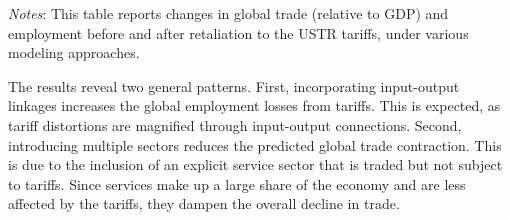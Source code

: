 \documentclass[12pt]{article}
\begin{document}
\begin{table}[htbp]
\caption{\emph{Global} trade and employment impacts of USTR tariffs}\label{tab: global}
\centering
{}
\vspace{-5pt}
\begin{flushleft}
\footnotesize{\textit{Notes}: This table reports changes in global trade (relative to GDP) and employment before and after retaliation to the USTR tariffs, under various modeling approaches.}
\end{flushleft}
\end{table}

The results reveal two general patterns. First, incorporating input-output linkages increases the global employment losses from tariffs. This is expected, as tariff distortions are magnified through input-output connections. Second, introducing multiple sectors reduces the predicted global trade contraction. This is due to the inclusion of an explicit service sector that is traded but not subject to tariffs. Since services make up a large share of the economy and are less affected by the tariffs, they dampen the overall decline in trade.



\end{document}
